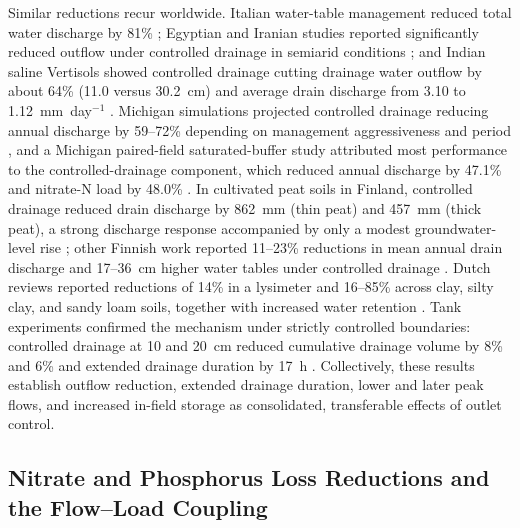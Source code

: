 Similar reductions recur worldwide. Italian water-table management reduced total
water discharge by 81\% \parencite{Tolomio2018}; Egyptian and Iranian studies
reported significantly reduced outflow under controlled drainage in semiarid
conditions \parencite{Wahba2001,Jouni2018}; and Indian saline Vertisols showed
controlled drainage cutting drainage water outflow by about 64\% (11.0 versus
30.2~cm) and average drain discharge from 3.10 to 1.12~mm~day$^{-1}$
\parencite{Karegoudar2019}. Michigan simulations projected controlled drainage
reducing annual discharge by 59--72\% depending on management aggressiveness and
period \parencite{BinShokrana2023}, and a Michigan paired-field saturated-buffer
study attributed most performance to the controlled-drainage component, which
reduced annual discharge by 47.1\% and nitrate-N load by 48.0\%
\parencite{Ghane2025}. In cultivated peat soils in Finland, controlled drainage
reduced drain discharge by 862~mm (thin peat) and 457~mm (thick peat), a strong
discharge response accompanied by only a modest groundwater-level rise
\parencite{Tähtikarhu2025}; other Finnish work reported 11--23\% reductions in
mean annual drain discharge and 17--36~cm higher water tables under controlled
drainage \parencite{Salla2022}. Dutch reviews reported reductions of 14\% in a
lysimeter and 16--85\% across clay, silty clay, and sandy loam soils, together
with increased water retention \parencite{deWit2022}. Tank experiments confirmed
the mechanism under strictly controlled boundaries: controlled drainage at 10
and 20~cm reduced cumulative drainage volume by 8\% and 6\% and extended
drainage duration by 17~h \parencite{Zheng2025}. Collectively, these results
establish outflow reduction, extended drainage duration, lower and later peak
flows, and increased in-field storage as consolidated, transferable effects of
outlet control.

\subsection{Nitrate and Phosphorus Loss Reductions and the Flow--Load Coupling}


